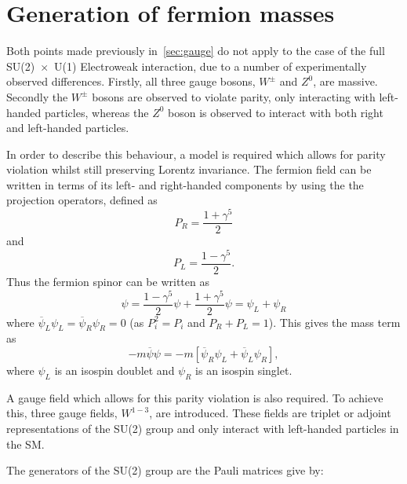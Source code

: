 \section{Generation of fermion masses}
\label{secmass}
Both points made previously in~\autoref{sec:gauge} do not apply to the case of the full SU(2)~$\times$~U(1) Electroweak interaction, due to a number of experimentally observed differences. Firstly, all three gauge bosons, $W^{\pm}$ and $Z^{0}$, are massive. Secondly the $W^{\pm}$ bosons are observed to violate parity, only interacting with left-handed particles, whereas the $Z^{0}$ boson is observed to interact with both right and left-handed particles. 

In order to describe this behaviour, a model is required which allows for parity violation whilst still preserving Lorentz invariance. The fermion field can be written in terms of its left- and right-handed components by using the the projection operators, defined as
\begin{equation}
  P_{R} = \frac{1+\gamma^{5}}{2}
\end{equation}
and
\begin{equation}
  P_{L} = \frac{1-\gamma^{5}}{2}.
\end{equation}
Thus the fermion spinor can be written as
\begin{equation}
\psi = \frac{1-\gamma^{5}}{2}\psi + \frac{1+\gamma^{5}}{2}\psi = \psi_{L}+\psi_{R}
\label{eq:proj}
\end{equation}
where $\overline{\psi}_{L}\psi_{L} = \overline{\psi}_{R}\psi_{R} = 0$ (as $P_{i}^{2} = P_{i}$ and $P_{R} + P_{L} = 1$). This gives the mass term as
\begin{equation}
   -m\overline{\psi}\psi = -m[\overline{\psi}_{R}\psi_{L} + \overline{\psi}_{L}\psi_{R}],
\end{equation}
where $\psi_{L}$ is an isospin doublet and $\psi_{R}$ is an isospin singlet.

A gauge field which allows for this parity violation is also required.  To achieve this, three gauge fields, $W^{1-3}$, are introduced.  These fields are triplet or adjoint representations of the SU(2) group and only interact with left-handed particles in the SM.

The generators of the SU(2) group are the Pauli matrices give by:

